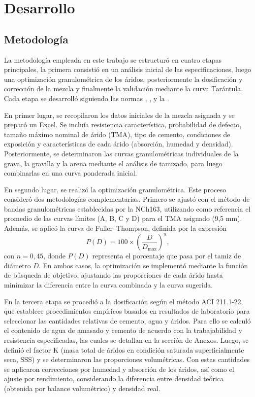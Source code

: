 \section{Desarrollo}

\subsection{Metodología}

La metodología empleada en este trabajo se estructuró en cuatro etapas principales, la primera consistió en un análisis inicial de las especificaciones, luego una optimización granulométrica de los áridos, posteriormente la dosificación y corrección de la mezcla y finalmente la validación mediante la curva Tarántula. Cada etapa se desarrolló siguiendo las normas \cite{NCh1632013}, \cite{ACI211_2022}, \cite{ACI318_2025} y la \cite{ACI301_2020}.

En primer lugar, se recopilaron los datos iniciales de la mezcla asignada y se preparó un Excel. Se incluía resistencia característica, probabilidad de defecto, tamaño máximo nominal de árido (TMA), tipo de cemento, condiciones de exposición y características de cada árido (absorción, humedad y densidad). Posteriormente, se determinaron las curvas granulométricas individuales de la grava, la gravilla y la arena mediante el análisis de tamizado, para luego combinarlas en una curva ponderada inicial.

En segundo lugar, se realizó la optimización granulométrica. Este proceso consideró dos metodologías complementarias. Primero se ajustó con el método de bandas granulométricas establecidas por la NCh163, utilizando como referencia el promedio de las curvas límites (A, B, C y D) para el TMA asignado (9,5 mm). Además, se aplicó la curva de Fuller–Thompson, definida por la expresión
\[
P(D) = 100 \times \left( \frac{D}{D_{\text{max}}} \right)^n,
\]
con $n = 0,45$, donde $P(D)$ representa el porcentaje que pasa por el tamiz de diámetro $D$. En ambos casos, la optimización se implementó mediante la función de búsqueda de objetivo, ajustando las proporciones de cada árido hasta minimizar la diferencia entre la curva combinada y la curva sugerida.

En la tercera etapa se procedió a la dosificación según el método ACI 211.1-22, que establece procedimientos empíricos basados en resultados de laboratorio para seleccionar las cantidades relativas de cemento, agua y áridos. Para ello se calculó el contenido de agua de amasado y cemento de acuerdo con la trabajabilidad y resistencia especificadas, las cuales se detallan en la sección de Anexos. Luego, se definió el factor K (masa total de áridos en condición saturada superficialmente seca, SSS) y se determinaron las proporciones volumétricas. Con estas cantidades se aplicaron correcciones por humedad y absorción de los áridos, así como el ajuste por rendimiento, considerando la diferencia entre densidad teórica (obtenida por balance volumétrico) y densidad real.

